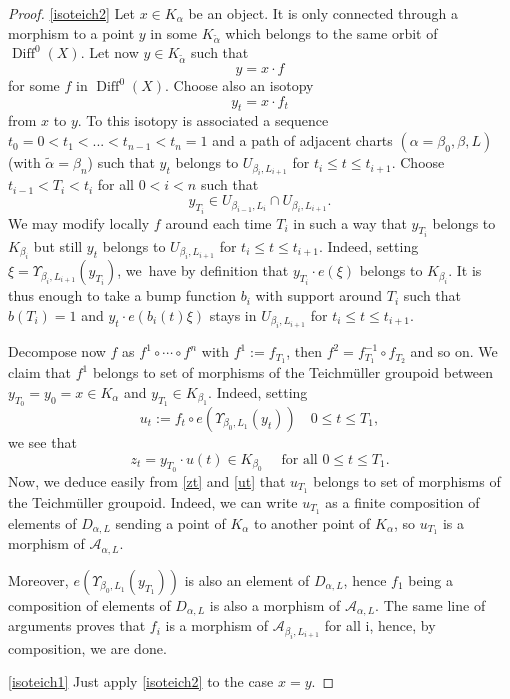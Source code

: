 \documentclass[JEP,XML,SOM,Unicode]{cedram}
\let\mathcal\mathscr
\DeclareMathOperator{\Diff}{Diff}
\theoremstyle{plain}
\theoremstyle{definition}
\theoremstyle{remark}
\numberwithin{equation}{section}
\begin{document}
\skpt
\begin{proof}
\eqref{isoteich2} Let $x\in K_{\alpha}$ be an object. It is only connected through a morphism to a point $y$ in some $K_{\tilde\alpha}$ which belongs to the same orbit of $\Diff^0(X)$.
Let now $y\in K_{\tilde\alpha}$ such that
\begin{equation}
\label{itii}
y=x\cdot f
\end{equation}
for some $f$ in $\Diff^0(X)$. Choose also an isotopy
\begin{equation}
\label{itisotopy}
y_t=x\cdot f_t
\end{equation}
from $x$ to $y$. To this isotopy is associated a sequence $t_0=0<t_1<...<t_{n-1}<t_n=1$ and a path of adjacent charts $(\alpha=\beta_0,\beta,L)$ (with $\tilde\alpha=\beta_n$) such that $y_t$ belongs to $U_{\beta_i,L_{i+1}}$ for $t_i\leq t\leq t_{i+1}$. Choose $t_{i-1}<T_i<t_{i}$ for all $0<i<n$ such that
\begin{equation}
y_{T_i}\in U_{\beta_{i-1},L_{i}}\cap U_{\beta_{i},L_{i+1}}.
\end{equation}
We may modify locally $f$ around each time $T_i$ in such a way that $y_{T_i}$ belongs to $K_{\beta_i}$ but still $y_t$ belongs to $U_{\beta_i,L_{i+1}}$ for $t_i\leq t\leq t_{i+1}$. Indeed, setting $\xi=\Upsilon_{\beta_i,L_{i+1}}(y_{T_i})$, we~have by definition that $y_{T_i}\cdot e(\xi)$ belongs to $K_{\beta_i}$.
It is thus enough to take a bump function $b_i$ with support around $T_i$ such that $b(T_i)=1$ and $y_t\cdot e(b_i(t)\xi)$ stays in $U_{\beta_i,L_{i+1}}$ for $t_i\leq t\leq t_{i+1}$.

Decompose now $f$ as $f^1\circ\cdots\circ f^n$ with $f^1:=f_{T_1}$, then $f^2=f_{T_1}^{-1}\circ f_{T_2}$ and so on. We claim that $f^1$ belongs to set of morphisms of the Teichmüller groupoid between $y_{T_0}=y_0=x\in K_\alpha$ and $y_{T_1}\in K_{\beta_1}$. Indeed, setting
\begin{equation}
\label{ut}
u_t:=f_t\circ e(\Upsilon_{\beta_0,L_1}(y_t))
\quad 0\leq t\leq T_1,
\end{equation}
we see that
\begin{equation}
\label{zt}
z_{t}=y_{T_0}\cdot u(t)\in K_{\beta_0}
\quad \text{ for all }0\leq t\leq T_1.
\end{equation}
Now, we deduce easily from \eqref{zt} and \eqref{ut} that $u_{T_1}$ belongs to set of morphisms of the Teichmüller groupoid. Indeed, we can write $u_{T_1}$ as a finite composition of elements of $D_{\alpha,L}$ sending a point of $K_\alpha$ to another point of $K_\alpha$, so $u_{T_1}$ is a morphism of $\mathcal A_{\alpha,L}$.

Moreover, $e(\Upsilon_{\beta_0,L_1}(y_{T_1}))$ is also an element of $D_{\alpha,L}$, hence $f_1$ being a composition of elements of $D_{\alpha,L}$ is also a morphism of $\mathcal A_{\alpha,L}$.
The same line of arguments proves that $f_i$ is a morphism of $\mathcal A_{\beta_i,L_{i+1}}$ for all i, hence, by composition, we are done.

\eqref{isoteich1} Just apply \eqref{isoteich2} to the case $x=y$.
\end{proof}
\end{document}
